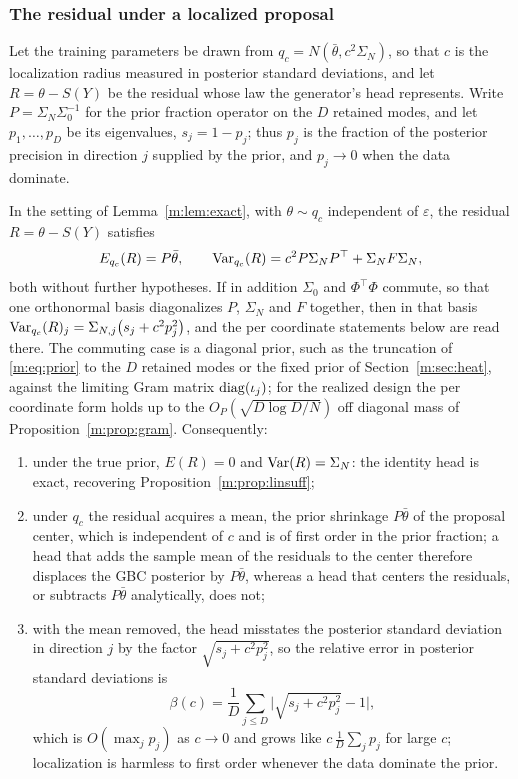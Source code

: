 \subsubsection{The residual under a localized proposal} Let the training parameters be drawn from $q_c=N(\bar\theta,c^2\Sigma_N)$, so that $c$ is the localization radius measured in posterior standard deviations, and let $R=\theta-S(Y)$ be the residual whose law the generator's head represents. Write $P=\Sigma_N\Sigma_0^{-1}$ for the prior fraction operator on the $D$ retained modes, and let $p_1,\dots,p_D$ be its eigenvalues, $s_j=1-p_j$; thus $p_j$ is the fraction of the posterior precision in direction $j$ supplied by the prior, and $p_j\to0$ when the data dominate.

\begin{theorem}\label{m:thm:locbias}
In the setting of Lemma~\ref{m:lem:exact}, with $\theta\sim q_c$ independent of $\varepsilon$, the residual $R=\theta-S(Y)$ satisfies
\begin{equation}\label{m:eq:varR}
E_{q_c}(R)=P\bar\theta,\qquad\mathrm{Var}_{q_c}(R)=c^2P\Sigma_NP^\top+\Sigma_NF\Sigma_N ,
\end{equation}
both without further hypotheses. If in addition $\Sigma_0$ and $\Phi^\top\Phi$ commute, so that one orthonormal basis diagonalizes $P$, $\Sigma_N$ and $F$ together, then in that basis $\mathrm{Var}_{q_c}(R)_j=\Sigma_{N,j}\big(s_j+c^2p_j^2\big)$, and the per coordinate statements below are read there. The commuting case is a diagonal prior, such as the truncation of \eqref{m:eq:prior} to the $D$ retained modes or the fixed prior of Section~\ref{m:sec:heat}, against the limiting Gram matrix $\operatorname{diag}(\iota_j)$; for the realized design the per coordinate form holds up to the $O_P(\sqrt{D\log D/N})$ off diagonal mass of Proposition~\ref{m:prop:gram}. Consequently:
\begin{enumerate}[label=(\roman*),nosep]
\item under the true prior, $E(R)=0$ and $\mathrm{Var}(R)=\Sigma_N$: the identity head is exact, recovering Proposition~\ref{m:prop:linsuff};
\item under $q_c$ the residual acquires a mean, the prior shrinkage $P\bar\theta$ of the proposal center, which is independent of $c$ and is of first order in the prior fraction; a head that adds the sample mean of the residuals to the center therefore displaces the GBC posterior by $P\bar\theta$, whereas a head that centers the residuals, or subtracts $P\bar\theta$ analytically, does not;
\item with the mean removed, the head misstates the posterior standard deviation in direction $j$ by the factor $\sqrt{s_j+c^2p_j^2}$, so the relative error in posterior standard deviations is
\begin{equation}\label{m:eq:bias}
\beta(c)=\frac1D\sum_{j\le D}\Big|\sqrt{s_j+c^2p_j^2}-1\Big| ,
\end{equation}
which is $O(\max_jp_j)$ as $c\to0$ and grows like $c\,\frac1D\sum_jp_j$ for large $c$; localization is harmless to first order whenever the data dominate the prior.
\end{enumerate}
\end{theorem}

